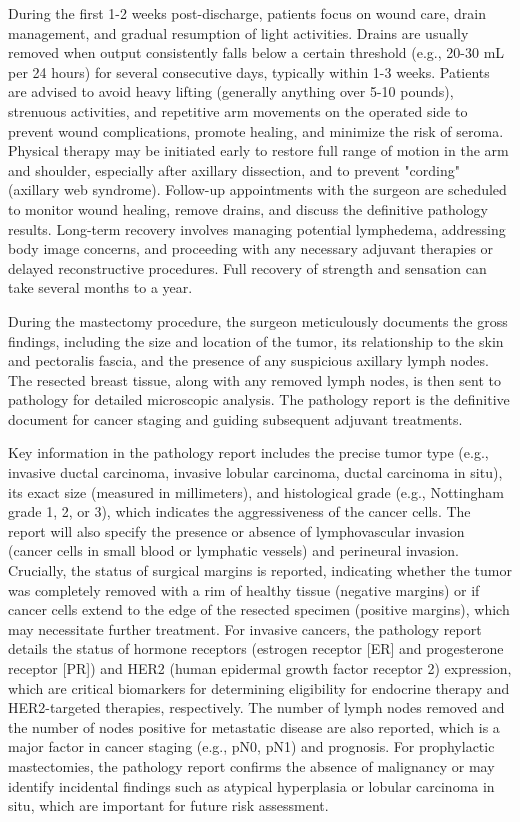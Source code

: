During the first 1-2 weeks post-discharge, patients focus on wound care, drain management, and gradual resumption of light activities. Drains are usually removed when output consistently falls below a certain threshold (e.g., 20-30 mL per 24 hours) for several consecutive days, typically within 1-3 weeks. Patients are advised to avoid heavy lifting (generally anything over 5-10 pounds), strenuous activities, and repetitive arm movements on the operated side to prevent wound complications, promote healing, and minimize the risk of seroma. Physical therapy may be initiated early to restore full range of motion in the arm and shoulder, especially after axillary dissection, and to prevent "cording" (axillary web syndrome). Follow-up appointments with the surgeon are scheduled to monitor wound healing, remove drains, and discuss the definitive pathology results. Long-term recovery involves managing potential lymphedema, addressing body image concerns, and proceeding with any necessary adjuvant therapies or delayed reconstructive procedures. Full recovery of strength and sensation can take several months to a year.

During the mastectomy procedure, the surgeon meticulously documents the gross findings, including the size and location of the tumor, its relationship to the skin and pectoralis fascia, and the presence of any suspicious axillary lymph nodes. The resected breast tissue, along with any removed lymph nodes, is then sent to pathology for detailed microscopic analysis. The pathology report is the definitive document for cancer staging and guiding subsequent adjuvant treatments.

Key information in the pathology report includes the precise tumor type (e.g., invasive ductal carcinoma, invasive lobular carcinoma, ductal carcinoma in situ), its exact size (measured in millimeters), and histological grade (e.g., Nottingham grade 1, 2, or 3), which indicates the aggressiveness of the cancer cells. The report will also specify the presence or absence of lymphovascular invasion (cancer cells in small blood or lymphatic vessels) and perineural invasion. Crucially, the status of surgical margins is reported, indicating whether the tumor was completely removed with a rim of healthy tissue (negative margins) or if cancer cells extend to the edge of the resected specimen (positive margins), which may necessitate further treatment. For invasive cancers, the pathology report details the status of hormone receptors (estrogen receptor [ER] and progesterone receptor [PR]) and HER2 (human epidermal growth factor receptor 2) expression, which are critical biomarkers for determining eligibility for endocrine therapy and HER2-targeted therapies, respectively. The number of lymph nodes removed and the number of nodes positive for metastatic disease are also reported, which is a major factor in cancer staging (e.g., pN0, pN1) and prognosis. For prophylactic mastectomies, the pathology report confirms the absence of malignancy or may identify incidental findings such as atypical hyperplasia or lobular carcinoma in situ, which are important for future risk assessment.


